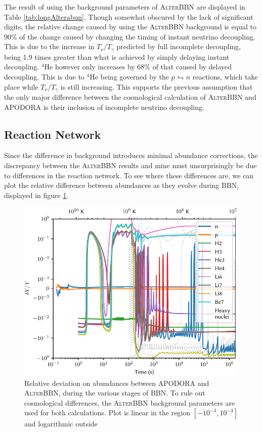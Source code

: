 The result of using the background parameters of \textsc{AlterBBN} are displayed in Table \ref{tab:longAlterabun}. Though somewhat obscured by the lack of significant digits, the relative change caused by using the \textsc{AlterBBN} background is equal to 90\% of the change caused by changing the timing of instant neutrino decoupling. This is due to the increase in $T_\nu/T_\gamma$ predicted by full incomplete decoupling, being 1.9 times greater than what is achieved by simply delaying instant decoupling. ${}^4$He however only increases by 68\% of that caused by delayed decoupling. This is due to ${}^4$He being governed by the $p\leftrightharpoons n$ reactions, which take place while $T_\nu/T_\gamma$ is still increasing. This supports the previous assumption that the only major difference between the cosmological calculation of \textsc{AlterBBN} and APODORA is their inclusion of incomplete neutrino decoupling.

\subsection{Reaction Network}

Since the difference in background introduces minimal abundance corrections, the discrepancy between the \textsc{AlterBBN} results and mine must unsurprisingly be due to differences in the reaction network. To see where these differences are, we can plot the relative difference between abundances as they evolve during BBN, displayed in figure \ref{fig:AlterBBNdeltaY}. 
\begin{figure}[ht]
    \includegraphics[width=5.1in]{figures/AlterBBNdeltaY.pdf}
    \caption{Relative deviation on abundances between APODORA and \textsc{AlterBBN}, during the various stages of BBN. To rule out cosmological differences, the \textsc{AlterBBN} background parameters are used for both calculations. Plot is linear in the region $[-10^{-3},10^{-3}]$ and logarithmic outside}
    \label{fig:AlterBBNdeltaY}
\end{figure}


